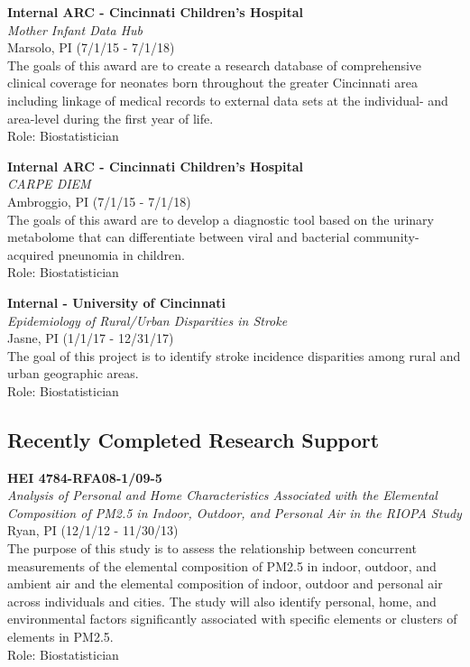 \documentclass{nihbiosketch}
\begin{document}
\bigskip

\textbf{Internal ARC - Cincinnati Children's Hospital}\\
\emph{Mother Infant Data Hub}\\
Marsolo, PI (7/1/15 - 7/1/18)\\
The goals of this award are to create a research database of
comprehensive clinical coverage for neonates born throughout the greater
Cincinnati area including linkage of medical records to external data
sets at the individual- and area-level during the first year of life.\\
Role: Biostatistician

\bigskip

\textbf{Internal ARC - Cincinnati Children's Hospital}\\
\emph{CARPE DIEM}\\
Ambroggio, PI (7/1/15 - 7/1/18)\\
The goals of this award are to develop a diagnostic tool based on the
urinary metabolome that can differentiate between viral and bacterial
community-acquired pneunomia in children.\\
Role: Biostatistician

\bigskip

\textbf{Internal - University of Cincinnati}\\
\emph{Epidemiology of Rural/Urban Disparities in Stroke}\\
Jasne, PI (1/1/17 - 12/31/17)\\
The goal of this project is to identify stroke incidence disparities
among rural and urban geographic areas.\\
Role: Biostatistician


\subsection*{Recently Completed Research Support}

\bigskip

\textbf{HEI 4784-RFA08-1/09-5}\\
\emph{Analysis of Personal and Home Characteristics Associated with the
	Elemental Composition of PM2.5 in Indoor, Outdoor, and Personal Air in
	the RIOPA Study}\\
Ryan, PI (12/1/12 - 11/30/13)\\
The purpose of this study is to assess the relationship between
concurrent measurements of the elemental composition of PM2.5 in indoor,
outdoor, and ambient air and the elemental composition of indoor,
outdoor and personal air across individuals and cities. The study will
also identify personal, home, and environmental factors significantly
associated with specific elements or clusters of elements in PM2.5.\\
Role: Biostatistician
\end{document}
